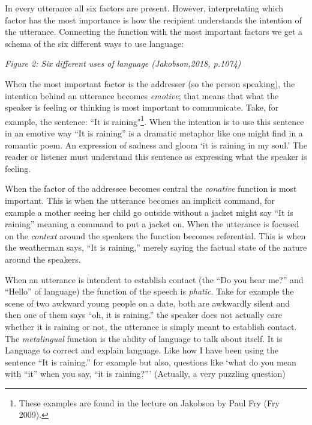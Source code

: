 \noindent In every utterance all six factors are present. However, interpretating which factor has the most importance is how the recipient understands the intention of the utterance. Connecting the function with the most important factors we get a schema of the six different ways to use language: 

\vspace{0.3cm}

\small
{}

{\it \footnotesize Figure 2: Six different uses of language (Jakobson,2018, p.1074)}

\vspace{0.3cm}


When the most important factor is the addresser (so the person speaking), the intention behind an utterance becomes \textit{emotive}; that means that what the speaker is feeling or thinking is most important to communicate. Take, for example, the sentence: “It is raining"\footnote{These examples are found  in the lecture on Jakobson by Paul Fry (Fry 2009).}. When the intention is to use this sentence in an emotive way “It is raining” is a dramatic metaphor like one might find in a romantic poem. An expression of sadness and gloom ‘it is raining in my soul.’ The reader or listener must understand this sentence as expressing what the speaker is feeling. 						

When the factor of the addressee becomes central the \textit{conative} function is most important. This is when the utterance becomes an implicit command, for example a mother seeing her child go outside without a jacket might say “It is raining” meaning a command to put a jacket on. 				
When the utterance is focused on the \textit{context} around  the speakers the function becomes referential. This is when the weatherman says, “It is raining,” merely saying the factual state of the nature around  the speakers. 				

When an utterance is intendent to establish contact (the “Do you hear me?” and “Hello” of language) the function of the speech is \textit{phatic}. Take for example the scene of two awkward young people on a date, both are awkwardly silent and then one of them says “oh, it is raining.” the speaker does not actually care whether it is raining or not, the utterance is simply meant to establish contact. 						
The \textit{metalingual} function is the ability of language to talk about itself. It is Language to correct and explain language. Like how I have been using the sentence “It is raining.” for example but also, questions like ‘what do you mean with “it” when you say, “it is raining?”’ (Actually, a very puzzling question) 							

